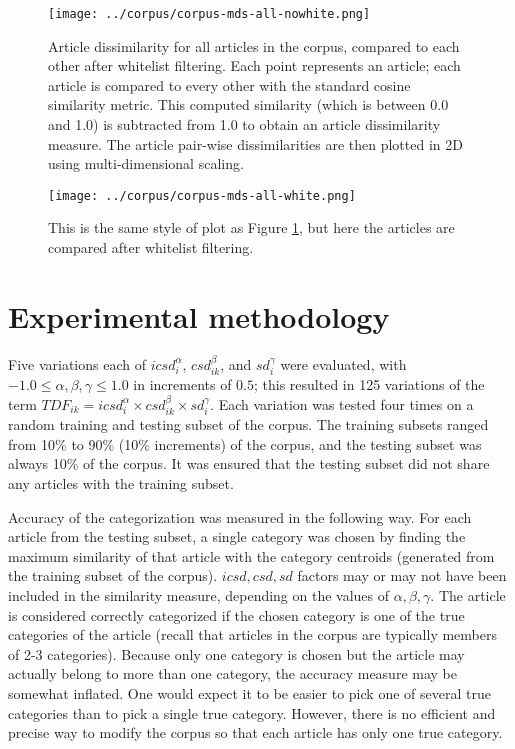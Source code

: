 \documentclass{article}
\begin{document}
\begin{figure}
\begin{center}
\texttt{[image: ../corpus/corpus-mds-all-nowhite.png]}
\caption{Article dissimilarity for all articles in the corpus, compared to each
other after whitelist filtering. Each point represents an article; each article
is compared to every other with the standard cosine similarity metric. This
computed similarity (which is between 0.0 and 1.0) is subtracted from 1.0 to
obtain an article dissimilarity measure. The article pair-wise dissimilarities
are then plotted in 2D using multi-dimensional scaling.}

\label{fig:mds-nowhite}
\end{center}
\end{figure}

\begin{figure}
\begin{center}
\texttt{[image: ../corpus/corpus-mds-all-white.png]}
\caption{This is the same style of plot as Figure \ref{fig:mds-nowhite}, but
here the articles are compared after whitelist filtering.}

\label{fig:mds-white}
\end{center}
\end{figure}

\section{Experimental methodology}

Five variations each of $icsd_i^{\alpha}$, $csd_{ik}^{\beta}$, and
$sd_i^{\gamma}$ were evaluated, with $- 1.0 \leq \alpha, \beta, \gamma \leq
1.0$ in increments of $0.5$; this resulted in 125 variations of the term
$TDF_{ik}=icsd_i^\alpha \times csd_{ik}^\beta \times sd_i^\gamma$. Each
variation was tested four times on a random training and testing subset of the
corpus. The training subsets ranged from 10\% to 90\% (10\% increments) of the
corpus, and the testing subset was always 10\% of the corpus. It was ensured
that the testing subset did not share any articles with the training subset.

Accuracy of the categorization was measured in the following way. For each
article from the testing subset, a single category was chosen by finding the
maximum similarity of that article with the category centroids (generated from
the training subset of the corpus). $icsd,csd,sd$ factors may or may not have
been included in the similarity measure, depending on the values of
$\alpha,\beta,\gamma$. The article is considered correctly categorized if the
chosen category is one of the true categories of the article (recall that
articles in the corpus are typically members of 2-3 categories). Because only
one category is chosen but the article may actually belong to more than one
category, the accuracy measure may be somewhat inflated. One would expect it to
be easier to pick one of several true categories than to pick a single true
category. However, there is no efficient and precise way to modify the corpus
so that each article has only one true category.
\end{document}
